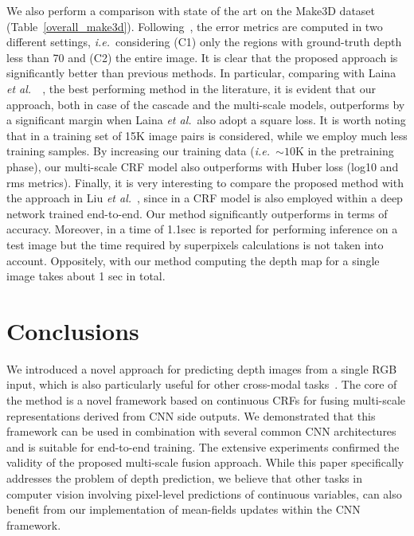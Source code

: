 \documentclass[10pt,twocolumn,letterpaper]{article}
\def\ie{\textit{i.e.}~}
\def\etal{\textit{et al.}~}
\begin{document}
We also perform a comparison with state of the art on the Make3D dataset (Table~\ref{overall_make3d}).
Following~\cite{liu2014discrete}, the error metrics are computed in two different settings, \ie considering (C1) only 
the regions with ground-truth depth less than 70 and (C2) the entire image. 
It is clear that the proposed approach is significantly better than previous methods. 
In particular, comparing with Laina \etal~\cite{laina2016deeper}, the best performing method in the literature, 
it is evident that our approach, both in case of the cascade and the multi-scale models, outperforms \cite{laina2016deeper} by a 
significant margin when Laina \etal also adopt a square loss. It is worth noting that in \cite{laina2016deeper} a 
training set of 15K image pairs is considered, while we employ much less training samples. 
By increasing our training data (\ie $\sim 10$K in the pretraining phase), our multi-scale CRF model also outperforms \cite{laina2016deeper}
with Huber loss (log10 and rms metrics). Finally, it is very interesting to compare the proposed method with the 
approach in Liu \etal\cite{liu2015deep}, since in \cite{liu2015deep} a CRF model is also employed within a deep network trained end-to-end. 
Our method significantly outperforms \cite{liu2015deep} in terms of accuracy. Moreover, in \cite{liu2015deep} a time of 1.1sec is reported 
for performing inference on a test image but the time required by superpixels calculations is not taken into account. Oppositely, with 
our method computing the depth map for a single image takes about 1 sec in total.










%
 \vspace{-0.1cm}

\section{Conclusions}
We introduced a novel approach for predicting depth images from a single RGB input, which is also particularly useful for other cross-modal tasks~\cite{xu2013novel,xu2017cvpr}. The core of the method is a novel framework based on continuous CRFs for fusing multi-scale representations derived from CNN side outputs. 
We demonstrated that this framework can be used in combination with several common CNN architectures and is suitable for end-to-end training. The extensive experiments confirmed the validity of the proposed multi-scale fusion approach. While this paper specifically addresses the problem of depth prediction, we believe that other tasks in computer vision involving pixel-level predictions
of continuous variables, can also benefit from our implementation of mean-fields updates within the CNN framework.


{\small


}
\end{document}
